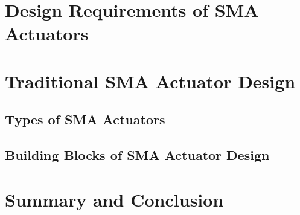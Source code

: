 \section{Design Requirements of SMA Actuators}
\section{Traditional SMA Actuator Design}
\subsection{Types of SMA Actuators}
\subsection{Building Blocks of SMA Actuator Design}
\section{Summary and Conclusion}
